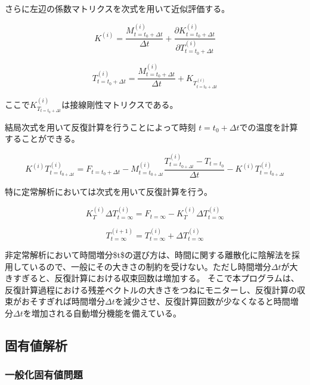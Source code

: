 \documentclass[a4paper,pandoc,ja=standard]{bxjsarticle}
\begin{document}
さらに左辺の係数マトリクスを次式を用いて近似評価する。

\[
K^{(i)} = \frac{M_{t=t_0+\Delta t}^{(i)}}{\Delta t} +
\frac{\partial K_{t=t_0+\Delta t}^{(i)}}{\partial T^{(i)}_{t=t_0+\Delta t}}
\]

\begin{equation}
T_{t=t_0+\Delta t}^{(i)}
= \frac{M_{t=t_0+\Delta t}^{(i)}}{\Delta t} + K_{T_{t=t_0+\Delta t}^{(i)}}
\label{eq:2.4.18}
\end{equation}

ここで\(K_{T_{t=t_0+\Delta t}}^{(i)}\)は接線剛性マトリクスである。

結局次式を用いて反復計算を行うことによって時刻 \(t=t_0+\Delta t\)での温度を計算することができる。

\begin{equation}
K^{(i)} T_{t=t_{0+\Delta t}}^{(i)} = F_{t=t_0+\Delta t} - M_{t=t_{0+\Delta t}}^{(i)} \frac{T_{t=t_{0+\Delta t}}^{(i)} - T_{t=t_0}}{\Delta t} - K^{(i)} T_{t=t_{0+\Delta t}}^{(i)}
\label{eq:2.4.19}
\end{equation}

特に定常解析においては次式を用いて反復計算を行う。

\[
K_T^{(i)} \Delta T_{t=\infty}^{(i)} = F_{t=\infty} - K_T^{(i)} \Delta T_{t=\infty}^{(i)}
\]

\begin{equation}
T_{t=\infty}^{(i+1)} = T_{t=\infty}^{(i)} + \Delta{T}_{t=\infty}^{(i)}
\label{eq:2.4.20}
\end{equation}

非定常解析において時間増分\$\Delta t\$の選び方は、時間に関する離散化に陰解法を採用しているので、一般にその大きさの制約を受けない。ただし時間増分\(\Delta t\)が大きすぎると、反復計算における収束回数は増加する。
そこで本プログラムは、反復計算過程における残差ベクトルの大きさをつねにモニターし、反復計算の収束がおそすぎれば時間増分\(\Delta t\)を減少させ、反復計算回数が少なくなると時間増分\(\Delta t\)を増加される自動増分機能を備えている。

\hypertarget{ux56faux6709ux5024ux89e3ux6790}{%
\subsection{固有値解析}\label{ux56faux6709ux5024ux89e3ux6790}}

\hypertarget{ux4e00ux822cux5316ux56faux6709ux5024ux554fux984c}{%
\subsubsection{一般化固有値問題}\label{ux4e00ux822cux5316ux56faux6709ux5024ux554fux984c}}
\end{document}
